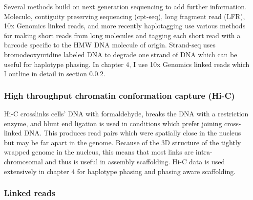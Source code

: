 \par{
Several methods build on next generation sequencing to add further information. Moleculo\cite{moleculo}, contiguity preserving sequencing (cpt-seq)\cite{cptseq}, long fragment read (LFR)\cite{LFR}, 10x Genomics linked reads\cite{10xlinked}, and more recently haplotagging\cite{haplotagging} use various methods for making short reads from long molecules and tagging each short read with a barcode specific to the HMW DNA molecule of origin. Strand-seq uses bromodeoxyuridine labeled DNA to degrade one strand of DNA which can be useful for haplotype phasing\cite{strandseq}\cite{strandseq5}\cite{strandseq2}\cite{strandseq3}. In chapter 4, I use 10x Genomics linked reads which I outline in detail in section \ref{section:linkedreads}.  
}

\subsubsection{High throughput chromatin conformation capture (Hi-C)}\label{section:hic}

\par{
Hi-C crosslinks cells' DNA with formaldehyde, breaks the DNA with a restriction enzyme, and blunt end ligation is used in conditions which prefer joining cross-linked DNA\cite{hic1}\cite{hic2}\cite{hic3}\cite{hic4}. This produces read pairs which were spatially close in the nucleus but may be far apart in the genome. Because of the 3D structure of the tightly wrapped genome in the nucleus, this means that most links are intra-chromosomal and thus is useful in assembly scaffolding\cite{SALSA}. Hi-C data is used extensively in chapter 4 for haplotype phasing and phasing aware scaffolding.
}


\subsubsection{Linked reads}\label{section:linkedreads}

